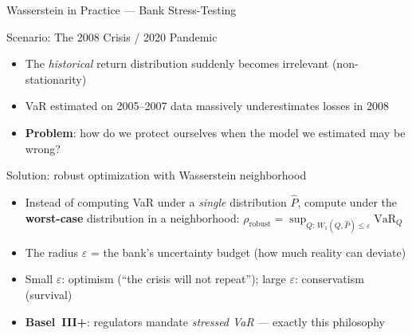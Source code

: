 \documentclass[9pt, aspectratio=169, t]{beamer}
\theoremstyle{definition}
\begin{document}
\begin{frame}{Wasserstein in Practice --- Bank Stress-Testing}
\begin{exampleblock}{Scenario: The 2008 Crisis / 2020 Pandemic}
\begin{itemize}\setlength\itemsep{2pt}
\item The \textit{historical} return distribution suddenly becomes irrelevant (non-stationarity)
\item VaR estimated on 2005--2007 data massively underestimates losses in 2008
\item \textbf{Problem}: how do we protect ourselves when the model we estimated may be wrong?
\end{itemize}
\end{exampleblock}
\begin{block}{Solution: robust optimization with Wasserstein neighborhood}
\begin{itemize}\setlength\itemsep{2pt}
\item Instead of computing VaR under a \textit{single} distribution $\hat{P}$, compute under the \textbf{worst-case} distribution in a neighborhood: $\rho_{\text{robust}} = \sup_{Q:\, W_1(Q, \hat{P}) \leq \varepsilon} \text{VaR}_Q$
\item The radius $\varepsilon$ = the bank's uncertainty budget (how much reality can deviate)
\item Small $\varepsilon$: optimism (``the crisis will not repeat''); large $\varepsilon$: conservatism (survival)
\item \textbf{Basel~III+}: regulators mandate \textit{stressed VaR} --- exactly this philosophy
\end{itemize}
\end{block}
\end{frame}
\end{document}
